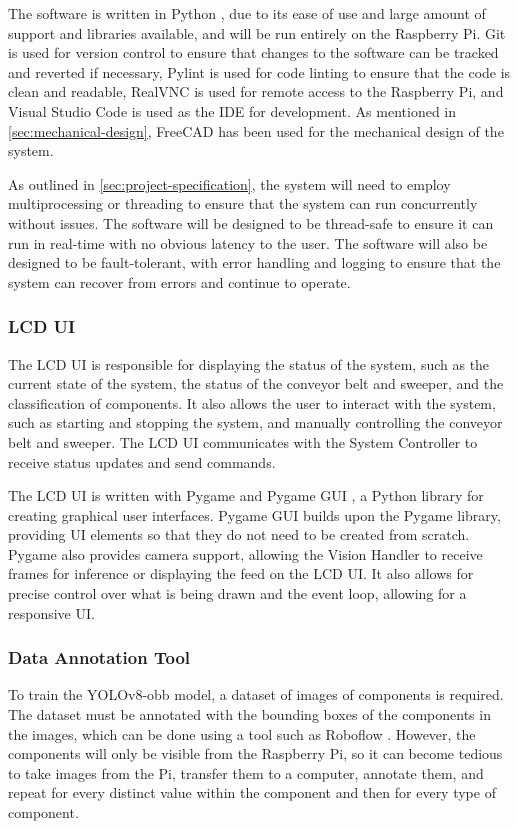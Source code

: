 The software is written in Python \cite{python}, due to its ease of use and large amount of support and libraries available, and will be run entirely on the Raspberry Pi. Git \cite{git} is used for version control to ensure that changes to the software can be tracked and reverted if necessary, Pylint \cite{pylint} is used for code linting to ensure that the code is clean and readable, RealVNC \cite{realvnc} is used for remote access to the Raspberry Pi, and Visual Studio Code \cite{vscode} is used as the IDE for development. As mentioned in \autoref{sec:mechanical-design}, FreeCAD \cite{freecad} has been used for the mechanical design of the system.

As outlined in \autoref{sec:project-specification}, the system will need to employ multiprocessing or threading to ensure that the system can run concurrently without issues. The software will be designed to be thread-safe to ensure it can run in real-time with no obvious latency to the user. The software will also be designed to be fault-tolerant, with error handling and logging to ensure that the system can recover from errors and continue to operate.

\subsubsection{LCD UI}
The LCD UI is responsible for displaying the status of the system, such as the current state of the system, the status of the conveyor belt and sweeper, and the classification of components. It also allows the user to interact with the system, such as starting and stopping the system, and manually controlling the conveyor belt and sweeper. The LCD UI communicates with the System Controller to receive status updates and send commands.

The LCD UI is written with Pygame \cite{pygamedoc} and Pygame GUI \cite{pygamegui}, a Python library for creating graphical user interfaces. Pygame GUI builds upon the Pygame library, providing UI elements so that they do not need to be created from scratch. Pygame also provides camera support, allowing the Vision Handler to receive frames for inference or displaying the feed on the LCD UI. It also allows for precise control over what is being drawn and the event loop, allowing for a responsive UI.

\subsubsection{Data Annotation Tool}
\label{sec:data-annotation-tool}
To train the YOLOv8-obb model, a dataset of images of components is required. The dataset must be annotated with the bounding boxes of the components in the images, which can be done using a tool such as Roboflow \cite{roboflow}. However, the components will only be visible from the Raspberry Pi, so it can become tedious to take images from the Pi, transfer them to a computer, annotate them, and repeat for every distinct value within the component and then for every type of component.


